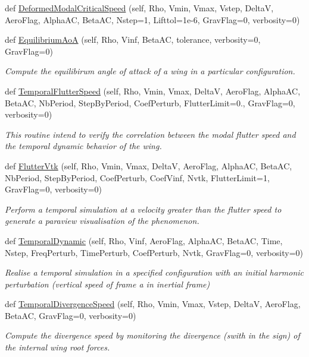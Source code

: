 \begin{DoxyCompactItemize}
def \hyperlink{classgebtaero_1_1_simulation_1_1_simulation_a7ed1c2f2548c11f435ed6dbb128c108d}{Deformed\+Modal\+Critical\+Speed} (self, Rho, Vmin, Vmax, Vstep, DeltaV, Aero\+Flag, Alpha\+AC, Beta\+AC, Nstep=1, Lifttol=1e-\/6, Grav\+Flag=0, verbosity=0)
\item 
def \hyperlink{classgebtaero_1_1_simulation_1_1_simulation_afd6e42af095216b12f40d6e07a71961e}{Equilibrium\+AoA} (self, Rho, Vinf, Beta\+AC, tolerance, verbosity=0, Grav\+Flag=0)
\begin{DoxyCompactList}\small\item\em Compute the equilibirum angle of attack of a wing in a particular configuration. \end{DoxyCompactList}\item 
def \hyperlink{classgebtaero_1_1_simulation_1_1_simulation_ac20465bedf1f645c1ac6fab9c45b0802}{Temporal\+Flutter\+Speed} (self, Rho, Vmin, Vmax, DeltaV, Aero\+Flag, Alpha\+AC, Beta\+AC, Nb\+Period, Step\+By\+Period, Coef\+Perturb, Flutter\+Limit=0., Grav\+Flag=0, verbosity=0)
\begin{DoxyCompactList}\small\item\em This routine intend to verify the correlation between the modal flutter speed and the temporal dynamic behavior of the wing. \end{DoxyCompactList}\item 
def \hyperlink{classgebtaero_1_1_simulation_1_1_simulation_a5c1dd2c7a88c06a76d854aa7ee1830ad}{Flutter\+Vtk} (self, Rho, Vmin, Vmax, DeltaV, Aero\+Flag, Alpha\+AC, Beta\+AC, Nb\+Period, Step\+By\+Period, Coef\+Perturb, Coef\+Vinf, Nvtk, Flutter\+Limit=1, Grav\+Flag=0, verbosity=0)
\begin{DoxyCompactList}\small\item\em Perform a temporal simulation at a velocity greater than the flutter speed to generate a paraview visualisation of the phenomenon. \end{DoxyCompactList}\item 
def \hyperlink{classgebtaero_1_1_simulation_1_1_simulation_abcfba8fd89bc92734326085c272134ae}{Temporal\+Dynamic} (self, Rho, Vinf, Aero\+Flag, Alpha\+AC, Beta\+AC, Time, Nstep, Freq\+Perturb, Time\+Perturb, Coef\+Perturb, Nvtk, Grav\+Flag=0, verbosity=0)
\begin{DoxyCompactList}\small\item\em Realise a temporal simulation in a specified configuration with an initial harmonic perturbation (vertical speed of frame a in inertial frame) \end{DoxyCompactList}\item 
def \hyperlink{classgebtaero_1_1_simulation_1_1_simulation_ac3dce2054614b2bbcac1bf97ab9e4ace}{Temporal\+Divergence\+Speed} (self, Rho, Vmin, Vmax, Vstep, DeltaV, Aero\+Flag, Beta\+AC, Grav\+Flag=0, verbosity=0)
\begin{DoxyCompactList}\small\item\em Compute the divergence speed by monitoring the divergence (swith in the sign) of the internal wing root forces. \end{DoxyCompactList}\end{DoxyCompactItemize}
